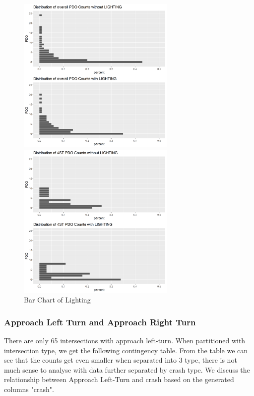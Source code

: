 \documentclass[11pt]{scrartcl} %
\begin{document}
\begin{figure}[H]
\begin{minipage}[t]{0.5\linewidth}
\centering
\includegraphics[width=3in]{image/LIGHTING_all_PDO.png}
\small
\end{minipage}
\begin{minipage}[t]{0.5\linewidth}
\centering
\includegraphics[width=3in]{image/LIGHTING_4ST_PDO.png}
\small
\end{minipage}
\caption{Bar Chart of Lighting}
\end{figure}

\subsubsection{Approach Left Turn and Approach Right Turn}

There are only 65 intersections with approach left-turn. When partitioned with intersection type, we get the following contingency table. From the table we can see that the counts get even smaller when separated into 3 type, there is not much sense to analyse with data further separated by crash type. We discuss the relationship between Approach Left-Turn and crash based on the generated columns "crash".
\end{document}
